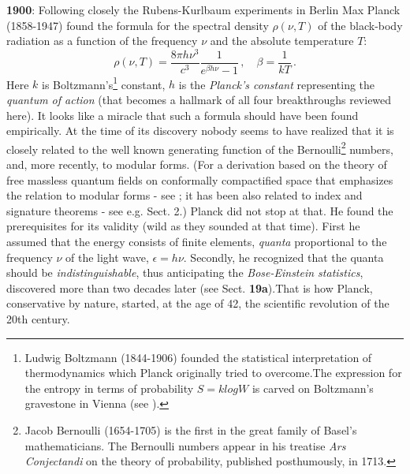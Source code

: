 {\bf 1900}: Following closely the Rubens-Kurlbaum experiments in Berlin Max
Planck (1858-1947) found the formula for the spectral density $\rho(\nu, T)$ of
 the black-body radiation  as a function of the frequency $\nu$ and the
absolute temperature $T$:
\begin{equation}
\label{Planck}
\rho(\nu, T) = \frac{8\pi h\nu^3}{c^3} \frac{1}{e^{\beta h \nu} - 1}\,, \quad \beta = \frac{1}{kT}\,.
\end{equation}
Here $k$ is Boltzmann's\footnote{Ludwig Boltzmann (1844-1906) founded the
statistical interpretation of thermodynamics which Planck originally tried to
overcome.The expression for the entropy in terms of probability $S = k log W$
is carved on Boltzmann's gravestone in Vienna (see \cite{Bl}).} constant, $h$ is the {\it Planck's
constant} representing the {\it quantum of action} (that becomes a hallmark of
all four breakthroughs reviewed here). It looks like a miracle that such a
formula should have been found empirically. At the time of its discovery nobody
 seems to have realized that it is closely related to the well known generating
 function of the Bernoulli\footnote{Jacob Bernoulli (1654-1705) is the first in
 the great family of Basel's mathematicians. The Bernoulli numbers appear in
his treatise {\it Ars Conjectandi} on the theory of probability, published
posthumously, in 1713.} numbers, and, more recently, to modular forms. (For a
derivation based on the theory of free massless quantum fields on conformally
compactified space that emphasizes the relation to modular forms - see
\cite{NT}; it has been also related to index and signature theorems - see e.g.
\cite{H71} Sect. 2.) Planck did not stop at that. He found the prerequisites for
 its validity (wild as they sounded at that time). First he assumed that the
energy consists of finite elements, {\it quanta} proportional to the frequency
$\nu$ of the light wave, $\epsilon = h\nu$. Secondly, he recognized that the
quanta should be {\it indistinguishable}, thus anticipating the {\it
Bose-Einstein statistics}, discovered more than two decades later (see \cite{P}
 Sect. {\bf 19a}).That is how Planck, conservative by nature, started, at the
age of 42, the scientific revolution of the 20th century.

